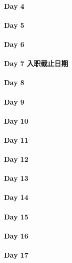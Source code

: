 \documentclass[UTF8,a4paper,8pt]{ctexart}
\begin{document}
 	 \paragraph{Day 4       \quad     }
 	 \paragraph{Day 5       \quad     }
 	 \paragraph{Day 6       \quad     }
 	 \paragraph{Day 7   入职截止日期    \quad     }
 	 \paragraph{Day 8       \quad     }
 	 \paragraph{Day 9       \quad     }
 	 \paragraph{Day 10      \quad     }
 	 \paragraph{Day 11      \quad     }
 	 \paragraph{Day 12      \quad     }
 	 \paragraph{Day 13      \quad     }
 	 \paragraph{Day 14      \quad     }
 	 \paragraph{Day 15      \quad     }
 	 \paragraph{Day 16      \quad     }
 	 \paragraph{Day 17      \quad     }
\end{document}
